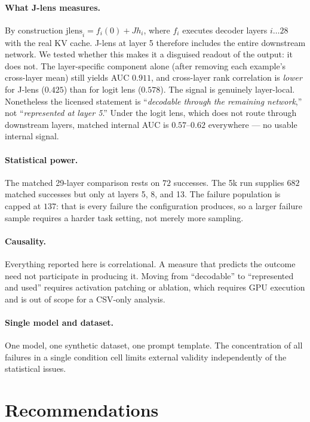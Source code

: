 \documentclass[11pt]{article}
\begin{document}
\paragraph{What J-lens measures.} By construction $\mathrm{jlens}_i = f_i(0) + J h_i$, where
$f_i$ executes decoder layers $i \ldots 28$ with the real KV cache. J-lens at layer 5
therefore includes the entire downstream network. We tested whether this makes it a
disguised readout of the output: it does not. The layer-specific component alone (after
removing each example's cross-layer mean) still yields AUC $0.911$, and cross-layer rank
correlation is \emph{lower} for J-lens ($0.425$) than for logit lens ($0.578$). The signal
is genuinely layer-local. Nonetheless the licensed statement is ``\emph{decodable through
the remaining network},'' not ``\emph{represented at layer 5}.'' Under the logit lens, which
does not route through downstream layers, matched internal AUC is $0.57$--$0.62$ everywhere
--- no usable internal signal.

\paragraph{Statistical power.} The matched 29-layer comparison rests on $72$ successes.
The 5k run supplies $682$ matched successes but only at layers 5, 8, and 13. The failure
population is capped at $137$: that is every failure the configuration produces, so a larger
failure sample requires a harder task setting, not merely more sampling.

\paragraph{Causality.} Everything reported here is correlational. A measure that predicts
the outcome need not participate in producing it. Moving from ``decodable'' to ``represented
and used'' requires activation patching or ablation, which requires GPU execution and is out
of scope for a CSV-only analysis.

\paragraph{Single model and dataset.} One model, one synthetic dataset, one prompt template.
The concentration of all failures in a single condition cell limits external validity
independently of the statistical issues.

\section{Recommendations}
\end{document}
